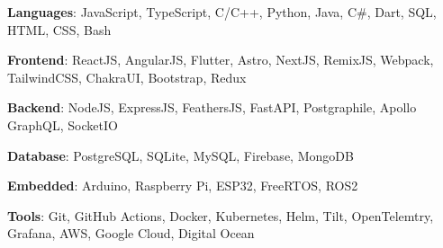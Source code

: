 \textbf{Languages}: JavaScript, TypeScript, C/C++, Python, Java, C\#, Dart, SQL, HTML, CSS, Bash \par
\textbf{Frontend}: ReactJS, AngularJS, Flutter, Astro, NextJS, RemixJS, Webpack, TailwindCSS, ChakraUI, Bootstrap, Redux \par
\textbf{Backend}: NodeJS, ExpressJS, FeathersJS, FastAPI, Postgraphile, Apollo GraphQL, SocketIO \par
\textbf{Database}: PostgreSQL, SQLite, MySQL, Firebase, MongoDB \par
\textbf{Embedded}: Arduino, Raspberry Pi, ESP32, FreeRTOS, ROS2 \par
\textbf{Tools}: Git, GitHub Actions, Docker, Kubernetes, Helm, Tilt, OpenTelemtry, Grafana, AWS, Google Cloud, Digital Ocean